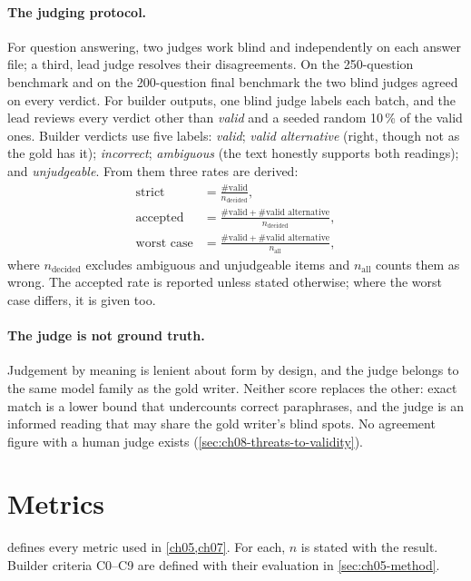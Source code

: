 \paragraph{The judging protocol.} For question answering, two judges work blind and independently on each
answer file; a third, lead judge resolves their disagreements. On the 250-question benchmark and on the
200-question final benchmark the two blind judges agreed on every verdict. For builder outputs, one blind judge labels each batch, and the lead reviews
every verdict other than \emph{valid} and a seeded random 10\,\% of the valid ones. Builder verdicts use five
labels: \emph{valid}; \emph{valid alternative} (right, though not as the gold has it); \emph{incorrect};
\emph{ambiguous} (the text honestly supports both readings); and \emph{unjudgeable}. From them three rates are
derived:
\begin{align*}
\text{strict} &= \frac{\#\text{valid}}{n_{\text{decided}}}, \\
\text{accepted} &= \frac{\#\text{valid} + \#\text{valid alternative}}{n_{\text{decided}}}, \\
\text{worst case} &= \frac{\#\text{valid} + \#\text{valid alternative}}{n_{\text{all}}},
\end{align*}
where $n_{\text{decided}}$ excludes ambiguous and unjudgeable items and $n_{\text{all}}$ counts them as wrong.
The accepted rate is reported unless stated otherwise; where the worst case differs, it is given too.

\paragraph{The judge is not ground truth.} Judgement by meaning is lenient about form by design, and the judge
belongs to the same model family as the gold writer. Neither score replaces the other: exact match is a lower
bound that undercounts correct paraphrases, and the judge is an informed reading that may share the gold
writer's blind spots. No agreement figure with a human judge exists (\cref{sec:ch08-threats-to-validity}).

\section{Metrics}\label{sec:ch03-metrics}

 defines every metric used in \cref{ch05,ch07}. For each, $n$ is stated with the result.
Builder criteria C0--C9 are defined with their evaluation in \cref{sec:ch05-method}.

